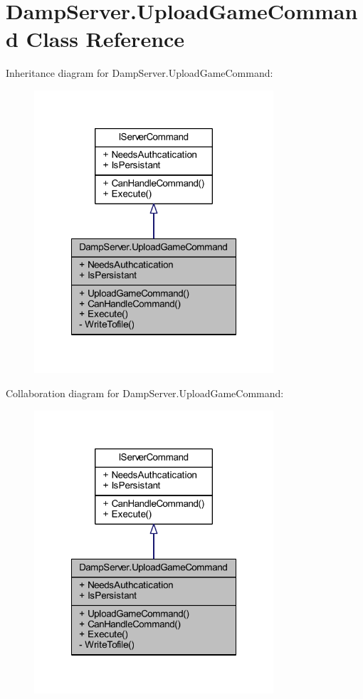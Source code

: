 \hypertarget{class_damp_server_1_1_upload_game_command}{\section{Damp\-Server.\-Upload\-Game\-Command Class Reference}
\label{class_damp_server_1_1_upload_game_command}
}


Inheritance diagram for Damp\-Server.\-Upload\-Game\-Command\-:
\nopagebreak
\begin{figure}[H]
\begin{center}
\leavevmode
\includegraphics[width=252pt]{class_damp_server_1_1_upload_game_command__inherit__graph}
\end{center}
\end{figure}


Collaboration diagram for Damp\-Server.\-Upload\-Game\-Command\-:
\nopagebreak
\begin{figure}[H]
\begin{center}
\leavevmode
\includegraphics[width=252pt]{class_damp_server_1_1_upload_game_command__coll__graph}
\end{center}
\end{figure}

